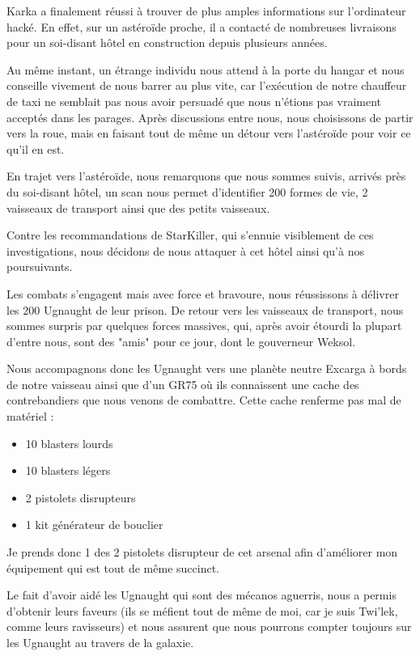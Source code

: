 \documentclass[a4paper,9pt,twoside,twocolumn,openany]{book}
\begin{document}
Karka a finalement réussi à trouver de plus amples informations sur l'ordinateur hacké. En effet, sur un astéroïde proche, il a contacté de nombreuses livraisons pour un soi-disant hôtel en construction depuis plusieurs années.

Au même instant, un étrange individu nous attend à la porte du hangar et nous conseille vivement de nous barrer au plus vite, car l’exécution de notre chauffeur de taxi ne semblait pas nous avoir persuadé que nous n’étions pas vraiment acceptés dans les parages. Après discussions entre nous, nous choisissons de partir vers la roue, mais en faisant tout de même un détour vers l’astéroïde pour voir ce qu’il en est.

En trajet vers l’astéroïde, nous remarquons que nous sommes suivis, arrivés près du soi-disant hôtel, un scan nous permet d’identifier 200 formes de vie, 2 vaisseaux de transport ainsi que des petits vaisseaux.

Contre les recommandations de StarKiller, qui s’ennuie visiblement de ces investigations, nous décidons de nous attaquer à cet hôtel ainsi qu’à nos poursuivants.

Les combats s’engagent mais avec force et bravoure, nous réussissons à délivrer les 200 Ugnaught de leur prison. De retour vers les vaisseaux de transport, nous sommes surpris par quelques forces massives, qui, après avoir étourdi la plupart d’entre nous, sont des "amis" pour ce jour, dont le gouverneur Weksol.

Nous accompagnons donc les Ugnaught vers une planète neutre Excarga à bords de notre vaisseau ainsi que d'un GR75 où ils connaissent une cache des contrebandiers que nous venons de combattre. Cette cache renferme pas mal de matériel :
\begin{itemize}
    \item 10 blasters lourds
    \item 10 blasters légers
    \item 2 pistolets disrupteurs
    \item 1 kit générateur de bouclier
\end{itemize}

Je prends donc 1 des 2 pistolets disrupteur de cet arsenal afin d’améliorer mon équipement qui est tout de même succinct.

Le fait d’avoir aidé les Ugnaught qui sont des mécanos aguerris, nous a permis d’obtenir leurs faveurs (ils se méfient tout de même de moi, car je suis Twi'lek, comme leurs ravisseurs) et nous assurent que nous pourrons compter toujours sur les Ugnaught au travers de la galaxie.
\end{document}
